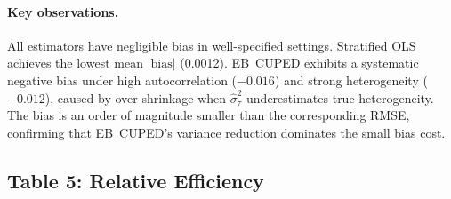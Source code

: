 \documentclass[11pt,letterpaper]{article}
\newcommand{\sigmahat}{\hat{\sigma}}
\begin{document}
\paragraph{Key observations.}
All estimators have negligible bias in well-specified settings.
Stratified OLS achieves the lowest mean $|\text{bias}|$ (0.0012).
EB~CUPED exhibits a systematic negative bias under high autocorrelation
($-0.016$) and strong heterogeneity ($-0.012$), caused by
over-shrinkage when $\sigmahat_\tau^2$ underestimates true
heterogeneity.  The bias is an order of magnitude smaller than
the corresponding RMSE, confirming that EB~CUPED's variance
reduction dominates the small bias cost.


\subsection{Table 5: Relative Efficiency}
\end{document}
